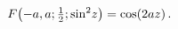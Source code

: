 \[\mathop{F\/}\nolimits\!\left(-a,a;\tfrac{1}{2};{\mathop{\sin\/}\nolimits^{2}}z%
\right)=\mathop{\cos\/}\nolimits\!\left(2az\right).\]